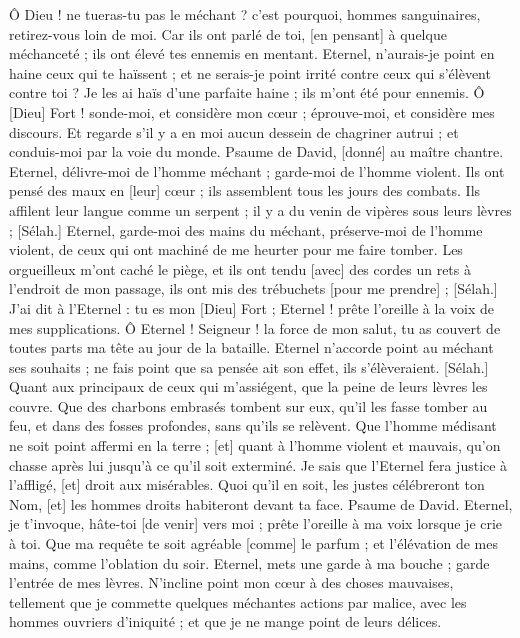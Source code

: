 \begin{multicols}{2}
Ô Dieu ! ne tueras-tu pas le méchant ? c'est pourquoi, hommes sanguinaires, retirez-vous loin de moi.
Car ils ont parlé de toi, [en pensant] à quelque méchanceté ; ils ont élevé tes ennemis en mentant.
Eternel, n'aurais-je point en haine ceux qui te haïssent ; et ne serais-je point irrité contre ceux qui s'élèvent contre toi ?
Je les ai haïs d'une parfaite haine ; ils m'ont été pour ennemis.
Ô [Dieu] Fort ! sonde-moi, et considère mon cœur ; éprouve-moi, et considère mes discours.
Et regarde s'il y a en moi aucun dessein de chagriner autrui ; et conduis-moi par la voie du monde.
\VerseOne{}Psaume de David, [donné] au maître chantre. Eternel, délivre-moi de l'homme méchant ; garde-moi de l'homme violent.
Ils ont pensé des maux en [leur] cœur ; ils assemblent tous les jours des combats.
Ils affilent leur langue comme un serpent ; il y a du venin de vipères sous leurs lèvres ; [Sélah.]
Eternel, garde-moi des mains du méchant, préserve-moi de l'homme violent, de ceux qui ont machiné de me heurter pour me faire tomber.
Les orgueilleux m'ont caché le piège, et ils ont tendu [avec] des cordes un rets à l'endroit de mon passage, ils ont mis des trébuchets [pour me prendre] ; [Sélah.]
J'ai dit à l'Eternel : tu es mon [Dieu] Fort ; Eternel ! prête l'oreille à la voix de mes supplications.
Ô Eternel ! Seigneur ! la force de mon salut, tu as couvert de toutes parts ma tête au jour de la bataille.
Eternel n'accorde point au méchant ses souhaits ; ne fais point que sa pensée ait son effet, ils s'élèveraient. [Sélah.]
Quant aux principaux de ceux qui m'assiégent, que la peine de leurs lèvres les couvre.
Que des charbons embrasés tombent sur eux, qu'il les fasse tomber au feu, et dans des fosses profondes, sans qu'ils se relèvent.
Que l'homme médisant ne soit point affermi en la terre ; [et] quant à l'homme violent et mauvais, qu'on chasse après lui jusqu’à ce qu'il soit exterminé.
Je sais que l'Eternel fera justice à l'affligé, [et] droit aux misérables.
Quoi qu'il en soit, les justes célébreront ton Nom, [et] les hommes droits habiteront devant ta face.
\VerseOne{}Psaume de David. Eternel, je t'invoque, hâte-toi [de venir] vers moi ; prête l'oreille à ma voix lorsque je crie à toi.
Que ma requête te soit agréable [comme] le parfum ; et l'élévation de mes mains, comme l'oblation du soir.
Eternel, mets une garde à ma bouche ; garde l'entrée de mes lèvres.
N'incline point mon cœur à des choses mauvaises, tellement que je commette quelques méchantes actions par malice, avec les hommes ouvriers d'iniquité ; et que je ne mange point de leurs délices.

\end{multicols}
